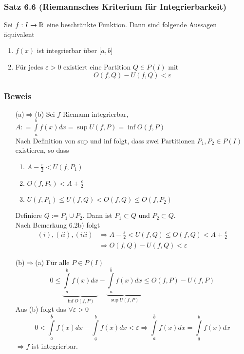 \subsubsection*{Satz 6.6 (Riemannsches Kriterium für Integrierbarkeit)}
Sei $f:I\to\mathbb{R}$ eine beschränkte Funktion. Dann sind folgende Aussagen äquivalent
\begin{enumerate}
\item $f(x)$ ist integrierbar über $\lbrack a,b\rbrack$
\item Für jedes $\varepsilon>0$ existiert eine Partition $Q\in P(I)$ mit \[O(f,Q)-U(f,Q)<\varepsilon\]
\end{enumerate}
\subsubsection*{Beweis}




\begin{enumerate}[align=left]
\item[(a)$\Rightarrow$(b)] Sei $f$ Riemann integrierbar, $A: = \int\limits_a^b {f(x)dx = \sup U(f,P) = \inf O(f,P)}$\\
Nach Definition von sup und inf folgt, dass zwei Partitionen $P_1,P_2\in P(I)$ existieren, so dass

\begin{enumerate}[\indent $(i)$]
\item $A-\frac{\varepsilon}{2}<U(f,P_1)$
\item $O(f,P_2)<A+\frac{\varepsilon}{2}$
\item $U(f,P_1) \leq U(f,Q) < O(f,Q) \leq O(f,P_2)$
\end{enumerate}

Definiere $Q:=P_1\cup P_2$. Dann ist $P_1\subset Q$ und $P_2 \subset Q$.\\
Nach Bemerkung 6.2b) folgt
\begin{align*}
(i),(ii),(iii)&\Rightarrow A-\frac{\varepsilon}{2}<U(f,Q)\leq O(f,Q)<A+\frac{\varepsilon}{2}\\
&\Rightarrow O(f,Q)-U(f,Q) < \varepsilon
\end{align*}
\item[(b)$\Rightarrow$(a)] Für alle $P\in P(I)$ \[0 \le \underbrace {\int\limits_{\underline{a}}^b {f(x)dx} }_{\inf O(f,P)} - \underbrace {\int\limits_a^{\overline{b}} {f(x)dx} }_{\sup U(f,P)} \le O(f,P) - U(f,P)\]
Aus (b) folgt das $\forall\varepsilon>0$ \[0 < \int\limits_a^{\overline{b}} {f(x)dx - \int\limits_{\underline{a}}^b {f(x)dx < \varepsilon } } \Rightarrow \int\limits_a^{\overline{b}} {f(x)dx = \int\limits_{\underline{a}}^b {f(x)dx} } \] $\Rightarrow f$ ist integrierbar.
\end{enumerate}


